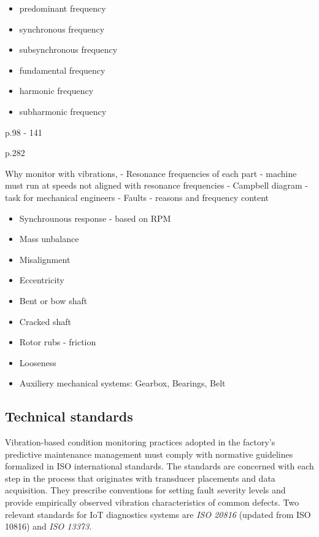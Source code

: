 \begin{itemize}
\item predominant frequency
\item synchronous frequency
\item subsynchronous frequency
\item fundamental frequency
\item harmonic frequency
\item subharmonic frequency
\end{itemize}

\cite{scheffer_practical_2004} p.98 - 141

\cite{davies_handbook_2012} p.282
\cite{torres_automatic_2022}
\cite{noauthor_vibration_2000}
\cite{cakir_experimental_2021}
\cite{ziaran_technicka_2013}

Why monitor with vibrations,
- Resonance frequencies of each part - machine must run at speeds not aligned with resonance frequencies - Campbell diagram - task for mechanical engineers
- Faults - reasons and frequency content


\begin{itemize}
\itemsep0pt
\item Synchrounous response - based on RPM
\item Mass unbalance
\item Misalignment
\item Eccentricity
\item Bent or bow shaft
\item Cracked shaft
\item Rotor rubs - friction
\item Looseness
\item Auxiliery mechanical systems: Gearbox, Bearings, Belt 
\end{itemize}

\cite{lengoc_vibration_1990}
\cite{chen_study_2014}

\subsection{Technical standards}
Vibration-based condition monitoring practices adopted in the factory's predictive maintenance management must comply with normative guidelines formalized in ISO international standards. The standards are concerned with each step in the process that originates with transducer placements and data acquisition. They prescribe conventions for setting fault severity levels and provide empirically observed vibration characteristics of common defects. Two relevant standards for IoT diagnostics systems are \emph{ISO 20816} (updated from ISO 10816) and \emph{ISO 13373}.
\bigbreak

